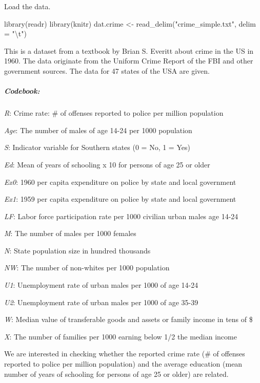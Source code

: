 \documentclass[
]{article}
\newenvironment{Shaded}{\begin{snugshade}}{\end{snugshade}}
\newcommand{\AttributeTok}[1]{\textcolor[rgb]{0.77,0.63,0.00}{#1}}
\newcommand{\FunctionTok}[1]{\textcolor[rgb]{0.00,0.00,0.00}{#1}}
\newcommand{\NormalTok}[1]{#1}
\newcommand{\OtherTok}[1]{\textcolor[rgb]{0.56,0.35,0.01}{#1}}
\newcommand{\SpecialCharTok}[1]{\textcolor[rgb]{0.00,0.00,0.00}{#1}}
\newcommand{\StringTok}[1]{\textcolor[rgb]{0.31,0.60,0.02}{#1}}
\begin{document}
Load the data.

\begin{Shaded}
\begin{Highlighting}[]
\FunctionTok{library}\NormalTok{(readr)}
\FunctionTok{library}\NormalTok{(knitr)}
\NormalTok{dat.crime }\OtherTok{\textless{}{-}} \FunctionTok{read\_delim}\NormalTok{(}\StringTok{"crime\_simple.txt"}\NormalTok{, }\AttributeTok{delim =} \StringTok{"}\SpecialCharTok{\textbackslash{}t}\StringTok{"}\NormalTok{)}
\end{Highlighting}
\end{Shaded}

This is a dataset from a textbook by Brian S. Everitt about crime in the
US in 1960. The data originate from the Uniform Crime Report of the FBI
and other government sources. The data for 47 states of the USA are
given.

\hypertarget{codebook}{%
\subparagraph{Codebook:}\label{codebook}}

\emph{R}: Crime rate: \# of offenses reported to police per million
population

\emph{Age}: The number of males of age 14-24 per 1000 population

\emph{S}: Indicator variable for Southern states (0 = No, 1 = Yes)

\emph{Ed}: Mean of years of schooling x 10 for persons of age 25 or
older

\emph{Ex0}: 1960 per capita expenditure on police by state and local
government

\emph{Ex1}: 1959 per capita expenditure on police by state and local
government

\emph{LF}: Labor force participation rate per 1000 civilian urban males
age 14-24

\emph{M}: The number of males per 1000 females

\emph{N}: State population size in hundred thousands

\emph{NW}: The number of non-whites per 1000 population

\emph{U1}: Unemployment rate of urban males per 1000 of age 14-24

\emph{U2}: Unemployment rate of urban males per 1000 of age 35-39

\emph{W}: Median value of transferable goods and assets or family income
in tens of \$

\emph{X}: The number of families per 1000 earning below 1/2 the median
income

We are interested in checking whether the reported crime rate (\# of
offenses reported to police per million population) and the average
education (mean number of years of schooling for persons of age 25 or
older) are related.
\end{document}
